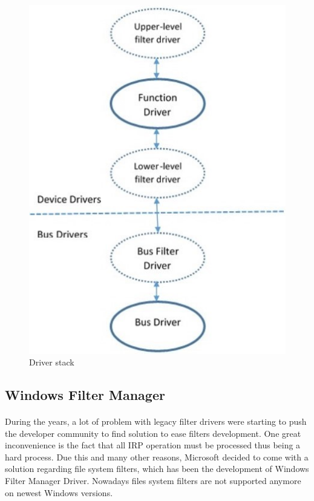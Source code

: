 	   	\begin{figure}[h!]
	   		\begin{center}
		   		\includegraphics[scale=0.7]{images/DriverStack.jpg}
		   		\caption{Driver stack\cite{WindowsDriverTutorial}}
		   		\label{fig:driverstack}
	   		\end{center}
	   	\end{figure}
	   
	   
		\subsection{Windows Filter Manager}
		\paragraph{}
		During the years, a lot of problem with legacy filter drivers were starting to push the developer community to find solution to ease filters development. One great inconvenience is the fact that all IRP operation must be processed thus being a hard process. Due this and many other reasons, Microsoft decided to come with a solution regarding file system filters, which has been the development of Windows Filter Manager Driver. Nowadays files system filters are not supported anymore on newest Windows versions.
		
